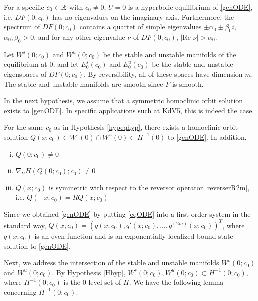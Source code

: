 \documentclass[thesis.tex]{subfiles}
\begin{document}
\begin{hypothesis}\label{hypeqhyp}
For a specific $c_0 \in {\mathbb R}$ with $c_0 \neq 0$, $U = 0$ is a hyperbolic equilibrium of \eqref{genODE}, i.e. $DF(0; c_0)$ has no eigenvalues on the imaginary axis. Furthermore, the spectrum of $DF(0; c_0)$ contains a quartet of simple eigenvalues $\pm \alpha_0 \pm \beta_0 i$, $\alpha_0, \beta_0 > 0$, and for any other eigenvalue $\nu$ of $DF(0; c_0)$, $|\text{Re }\nu| > \alpha_0$.
\end{hypothesis}
Let $W^s(0; c_0)$ and $W^u(0; c_0)$ be the stable and unstable manifolds of the equilibrium at 0, and let $E_0^s(c_0)$ and $E_0^u(c_0)$ be the stable and unstable eigenspaces of $DF(0; c_0)$. By reversibility, all of these spaces have dimension $m$. The stable and unstable manifolds are smooth since $F$ is smooth.

In the next hypothesis, we assume that a symmetric homoclinic orbit solution exists to \eqref{genODE}. In specific applications such at KdV5, this is indeed the case.

\begin{hypothesis}\label{Qexistshyp}
For the same $c_0$ as in Hypothesis \ref{hypeqhyp}, there exists a homoclinic orbit solution $Q(x; c_0) \in W^s(0) \cap W^u(0) \subset H^{-1}(0)$ to \eqref{genODE}. In addition,
\begin{enumerate}[(i)]
\item $Q(0; c_0) \neq 0$
\item $\nabla_U H(Q(0; c_0); c_0) \neq 0$
\item $Q(x; c_0)$ is symmetric with respect to the reversor operator \eqref{reverserR2m}, i.e. $Q(-x; c_0) = R Q(x; c_0)$
\end{enumerate}
\end{hypothesis}

Since we obtained \eqref{genODE} by putting \eqref{eqODE} into a first order system in the standard way, $Q(x; c_0) = (q(x; c_0), q'(x; c_0), \dots, q^{(2m)}(x; c_0))^T$, where $q(x; c_0)$ is an even function and is an exponentially localized bound state solution to \eqref{genODE}. 

Next, we address the intersection of the stable and unstable manifolds $W^s(0; c_0)$ and $W^u(0; c_0)$. By Hypothesis \ref{Hhyp}, $W^s(0; c_0), W^u(0; c_0) \subset H^{-1}(0; c_0)$, where $H^{-1}(0; c_0)$ is the 0-level set of $H$. We have the following lemma concerning $H^{-1}(0; c_0)$.
\end{document}
